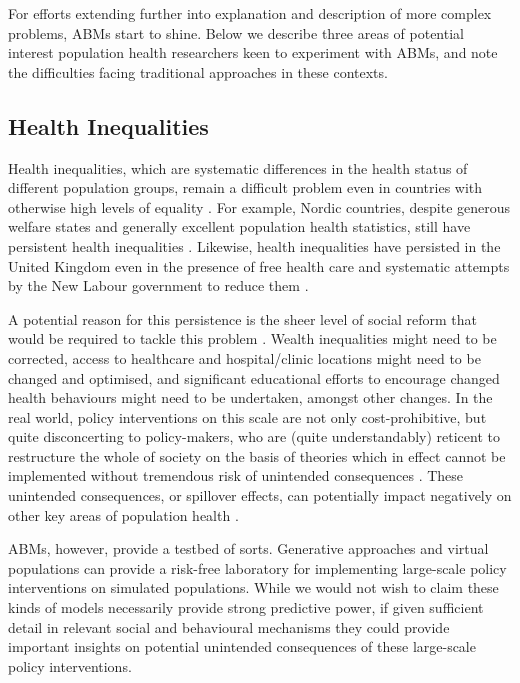 \documentclass[review]{elsarticle}
\begin{document}
For efforts extending further into explanation and description of more complex problems, ABMs start to shine.  Below we describe three areas of potential interest population health researchers keen to experiment with ABMs, and note the difficulties facing traditional approaches in these contexts.

\subsection{Health Inequalities}

Health inequalities, which are systematic differences in the health status of different population groups, remain a difficult problem even in countries with otherwise high levels of equality \citep{bambra2011}. For example, Nordic countries, despite generous welfare states and generally excellent population health statistics, still have persistent health inequalities \citep{shaw2014}. Likewise, health inequalities have persisted in the United Kingdom even in the presence of free health care and systematic attempts by the New Labour government to reduce them \citep{mackenbach2011}.  

A potential reason for this persistence is the sheer level of social reform that would be required to tackle this problem \citep{mackenbach2011}.  Wealth inequalities might need to be corrected, access to healthcare and hospital/clinic locations might need to be changed and optimised, and significant educational efforts to encourage changed health behaviours might need to be undertaken, amongst other changes.  In the real world, policy interventions on this scale are not only cost-prohibitive, but quite disconcerting to policy-makers, who are (quite understandably) reticent to restructure the whole of society on the basis of theories which in effect cannot be implemented without tremendous risk of unintended consequences \citep{berkman2011}.  These unintended consequences, or spillover effects, can potentially impact negatively on other key areas of population health \citep{lorenc2014}. 

ABMs, however, provide a testbed of sorts.  Generative approaches and virtual populations can provide a risk-free laboratory for implementing large-scale policy interventions on simulated populations.  While we would not wish to claim these kinds of models necessarily provide strong predictive power, if given sufficient detail in relevant social and behavioural mechanisms they could provide important insights on potential unintended consequences of these large-scale policy interventions.
\end{document}
